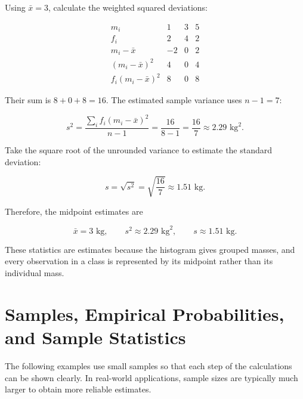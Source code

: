 Using $\bar{x}=3$, calculate the weighted squared deviations:

\[
\begin{array}{c|ccc}
    m_i & 1 & 3 & 5 \\ \hline
    f_i & 2 & 4 & 2 \\
    m_i-\bar{x} & -2 & 0 & 2 \\
    (m_i-\bar{x})^2 & 4 & 0 & 4 \\
    f_i(m_i-\bar{x})^2 & 8 & 0 & 8
\end{array}
\]

Their sum is $8+0+8=16$. The estimated sample variance uses $n-1=7$:

\[
s^2=\frac{\sum_i f_i(m_i-\bar{x})^2}{n-1}
=\frac{16}{8-1}=\frac{16}{7}\approx2.29\text{ kg}^2.
\]

Take the square root of the unrounded variance to estimate the standard deviation:

\[
s=\sqrt{s^2}=\sqrt{\frac{16}{7}}\approx1.51\text{ kg}.
\]

Therefore, the midpoint estimates are

\[
\boxed{\bar{x}=3\text{ kg},\qquad
s^2\approx2.29\text{ kg}^2,\qquad s\approx1.51\text{ kg}.}
\]

These statistics are estimates because the histogram gives grouped masses,
and every observation in a class is represented by its midpoint rather
than its individual mass.


\section{Samples, Empirical Probabilities, and Sample Statistics}
\label{sec:c6-specific-statistics}

\vspace{5mm}

The following examples use small samples so that each step of the calculations can be shown clearly. In real-world applications, sample sizes are typically much larger to obtain more reliable estimates.

